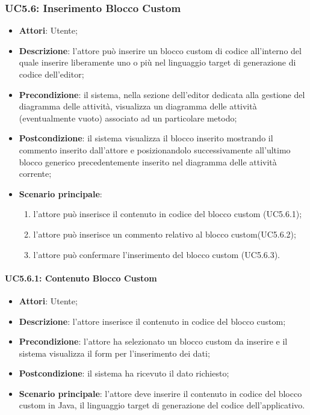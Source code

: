 \begin{itemize}
\begin{itemize}
\begin{itemize}
\begin{itemize}
\subsubsection{UC5.6: Inserimento Blocco Custom}
\label{UC5.6}
\begin{itemize}
	\item \textbf{Attori}: Utente;
	\item \textbf{Descrizione}: l'attore può inserire un blocco custom di codice all'interno del quale inserire liberamente uno o più  nel linguaggio target di generazione di codice dell'editor;
	\item \textbf{Precondizione}: il sistema, nella sezione dell'editor dedicata alla gestione del diagramma delle attività, visualizza un diagramma delle attività (eventualmente vuoto) associato ad un particolare metodo;
	\item \textbf{Postcondizione}: il sistema visualizza il blocco inserito mostrando il commento inserito dall'attore e posizionandolo successivamente all'ultimo blocco generico precedentemente
	inserito nel diagramma delle attività corrente;
	\item \textbf{Scenario principale}:
	\begin{enumerate}
		\item l'attore può inserisce il contenuto in codice del blocco custom (UC5.6.1);
		\item l'attore può inserisce un commento relativo al blocco custom(UC5.6.2);
		\item l'attore può confermare l'inserimento del blocco custom (UC5.6.3).
	\end{enumerate}
\end{itemize}

\paragraph{UC5.6.1: Contenuto Blocco Custom}
\label{UC5.6.1}
\begin{itemize}
	\item \textbf{Attori}: Utente;
	\item \textbf{Descrizione}: l'attore inserisce il contenuto in codice del blocco custom;
	\item \textbf{Precondizione}: l'attore ha selezionato un blocco custom da inserire e il sistema visualizza il form per l'inserimento dei dati;
	\item \textbf{Postcondizione}: il sistema ha ricevuto il dato richiesto;
	\item \textbf{Scenario principale}: l'attore deve inserire il contenuto in codice del blocco custom in Java, il linguaggio target di generazione del codice dell'applicativo.
\end{itemize}


\end{itemize}
\end{itemize}
\end{itemize}
\end{itemize}
